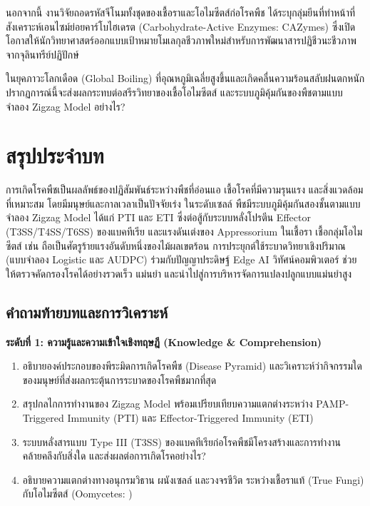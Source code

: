 นอกจากนี้ งานวิจัยถอดรหัสจีโนมทั้งชุดของเชื้อราและโอไมซีตส์ก่อโรคพืช \cite{pmid38431601} ได้ระบุกลุ่มยีนที่ทำหน้าที่สังเคราะห์เอนไซม์ย่อยคาร์โบไฮเดรต (Carbohydrate-Active Enzymes: CAZymes) ซึ่งเปิดโอกาสให้นักวิทยาศาสตร์ออกแบบเป้าหมายโมเลกุลชีวภาพใหม่สำหรับการพัฒนาสารปฏิชีวนะชีวภาพจากจุลินทรีย์ปฏิปักษ์

\begin{insight}
ในยุคภาวะโลกเดือด (Global Boiling) ที่อุณหภูมิเฉลี่ยสูงขึ้นและเกิดคลื่นความร้อนสลับฝนตกหนัก ปรากฏการณ์นี้จะส่งผลกระทบต่อสรีรวิทยาของเชื้อโอไมซีตส์  และระบบภูมิคุ้มกันของพืชตามแบบจำลอง Zigzag Model อย่างไร?
\end{insight}

\section*{สรุปประจำบท}

การเกิดโรคพืชเป็นผลลัพธ์ของปฏิสัมพันธ์ระหว่างพืชที่อ่อนแอ เชื้อโรคที่มีความรุนแรง และสิ่งแวดล้อมที่เหมาะสม โดยมีมนุษย์และกาลเวลาเป็นปัจจัยเร่ง ในระดับเซลล์ พืชมีระบบภูมิคุ้มกันสองชั้นตามแบบจำลอง Zigzag Model ได้แก่ PTI และ ETI ซึ่งต่อสู้กับระบบหลั่งโปรตีน Effector (T3SS/T4SS/T6SS) ของแบคทีเรีย และแรงดันเต่งของ Appressorium ในเชื้อรา เชื้อกลุ่มโอไมซีตส์ เช่น  ถือเป็นศัตรูร้ายแรงอันดับหนึ่งของไม้ผลเขตร้อน การประยุกต์ใช้ระบาดวิทยาเชิงปริมาณ (แบบจำลอง Logistic และ AUDPC) ร่วมกับปัญญาประดิษฐ์ Edge AI วิทัศน์คอมพิวเตอร์ ช่วยให้ตรวจคัดกรองโรคได้อย่างรวดเร็ว แม่นยำ และนำไปสู่การบริหารจัดการแปลงปลูกแบบแม่นยำสูง

\subsection*{คำถามท้ายบทและการวิเคราะห์}

\noindent \textbf{ระดับที่ 1: ความรู้และความเข้าใจเชิงทฤษฎี (Knowledge \& Comprehension)}
\begin{enumerate}
    \item อธิบายองค์ประกอบของพีระมิดการเกิดโรคพืช (Disease Pyramid) และวิเคราะห์ว่ากิจกรรมใดของมนุษย์ที่ส่งผลกระตุ้นการระบาดของโรคพืชมากที่สุด
    \item สรุปกลไกการทำงานของ Zigzag Model พร้อมเปรียบเทียบความแตกต่างระหว่าง PAMP-Triggered Immunity (PTI) และ Effector-Triggered Immunity (ETI)
    \item ระบบหลั่งสารแบบ Type III (T3SS) ของแบคทีเรียก่อโรคพืชมีโครงสร้างและการทำงานคล้ายคลึงกับสิ่งใด และส่งผลต่อการเกิดโรคอย่างไร?
    \item อธิบายความแตกต่างทางอนุกรมวิธาน ผนังเซลล์ และวงจรชีวิต ระหว่างเชื้อราแท้ (True Fungi) กับโอไมซีตส์ (Oomycetes: )
\end{enumerate}

